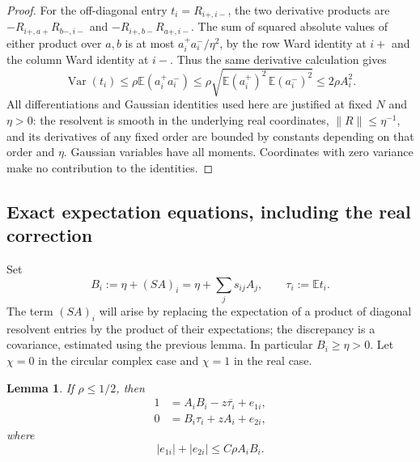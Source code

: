 \documentclass[11pt,reqno]{amsart}
\numberwithin{equation}{section}
\theoremstyle{plain}
\newtheorem{lemma}[theorem]{Lemma}
\theoremstyle{definition}
\theoremstyle{remark}
\begin{document}
\begin{proof}
For the off-diagonal entry $t_i=R_{i+,i-}$, the two derivative products
are $-R_{i+,a+}R_{b-,i-}$ and $-R_{i+,b-}R_{a+,i-}$.
The sum of squared absolute values of either product over $a,b$ is at most $a_i^+a_i^-/\eta^2$, by the
row Ward identity at $i+$ and the column Ward identity at $i-$.
Thus the same derivative calculation gives
\[
 \operatorname{Var}(t_i)\le\rho\mathbb E(a_i^+a_i^-)
 \le\rho\sqrt{\mathbb E(a_i^+)^2\,\mathbb E(a_i^-)^2}
 \le2\rho A_i^2.
\]
All differentiations and Gaussian identities used here are justified at
fixed $N$ and $\eta>0$: the resolvent is smooth in the underlying real
coordinates, $\|R\|\le\eta^{-1}$, and its derivatives of any fixed order
are bounded by constants depending on that order and $\eta$.  Gaussian
variables have all moments.  Coordinates with zero variance make no
contribution to the identities.
\end{proof}

\subsection{Exact expectation equations, including the real correction}

Set
\begin{equation}\label{eq:coarse-B-tau}
 B_i:=\eta+(SA)_i=\eta+\sum_js_{ij}A_j,\qquad
 \tau_i:=\mathbb Et_i.
\end{equation}
The term $(SA)_i$ will arise by replacing the expectation of a product
of diagonal resolvent entries by the product of their expectations;
the discrepancy is a covariance, estimated using the previous lemma.
In particular $B_i\ge\eta>0$. Let $\chi=0$ in the circular complex case
and $\chi=1$ in the real case.

\begin{lemma}\label{lem:coarse-expectation-equations}
If $\rho\le1/2$, then
\begin{align}
 1&=A_iB_i-z\overline{\tau_i}+e_{1i},
 \label{eq:coarse-SD-diagonal}\\
 0&=B_i\tau_i+zA_i+e_{2i},
 \label{eq:coarse-SD-offdiagonal}
\end{align}
where
\begin{equation}\label{eq:coarse-error-bound}
 |e_{1i}|+|e_{2i}|\le C\rho A_iB_i.
\end{equation}
\end{lemma}
\end{document}
